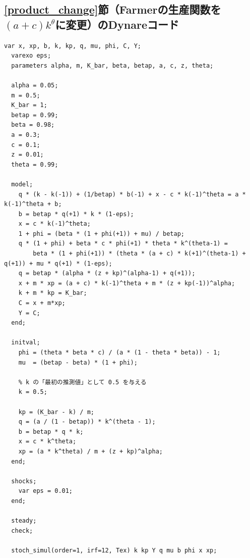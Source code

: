 \documentclass[dvipdfmx]{jlreq}
\begin{document}
\subsection*{\ref{product_change}節（Farmerの生産関数を$(a+c)k^\theta$に変更）のDynareコード}
\begin{lstlisting}[mathescape=true]
  var x, xp, b, k, kp, q, mu, phi, C, Y;
  varexo eps;
  parameters alpha, m, K_bar, beta, betap, a, c, z, theta;
  
  alpha = 0.05;
  m = 0.5;
  K_bar = 1;
  betap = 0.99;
  beta = 0.98;
  a = 0.3;  
  c = 0.1;
  z = 0.01;
  theta = 0.99;

  model;
    q * (k - k(-1)) + (1/betap) * b(-1) + x - c * k(-1)^theta = a * k(-1)^theta + b;
    b = betap * q(+1) * k * (1-eps);
    x = c * k(-1)^theta;
    1 + phi = (beta * (1 + phi(+1)) + mu) / betap;
    q * (1 + phi) + beta * c * phi(+1) * theta * k^(theta-1) = 
        beta * (1 + phi(+1)) * (theta * (a + c) * k(+1)^(theta-1) + q(+1)) + mu * q(+1) * (1-eps);
    q = betap * (alpha * (z + kp)^(alpha-1) + q(+1));
    x + m * xp = (a + c) * k(-1)^theta + m * (z + kp(-1))^alpha;
    k + m * kp = K_bar;
    C = x + m*xp;
    Y = C;
  end;

  initval;
    phi = (theta * beta * c) / (a * (1 - theta * beta)) - 1;
    mu  = (betap - beta) * (1 + phi);
  
    % k の「最初の推測値」として 0.5 を与える
    k = 0.5; 
  
    kp = (K_bar - k) / m;
    q = (a / (1 - betap)) * k^(theta - 1);
    b = betap * q * k;
    x = c * k^theta;
    xp = (a * k^theta) / m + (z + kp)^alpha;
  end;

  shocks;
    var eps = 0.01;
  end;

  steady;
  check;

  stoch_simul(order=1, irf=12, Tex) k kp Y q mu b phi x xp;
\end{lstlisting}
\end{document}
